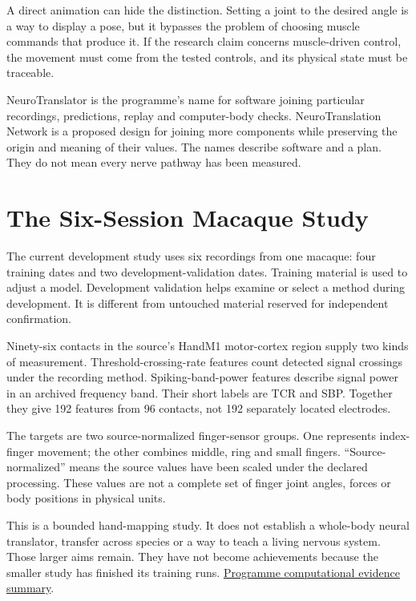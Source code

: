 A direct animation can hide the distinction. Setting a joint to the desired angle is a way to display a pose, but it bypasses the problem of choosing muscle commands that produce it. If the research claim concerns muscle-driven control, the movement must come from the tested controls, and its physical state must be traceable.\par

NeuroTranslator is the programme's name for software joining particular recordings, predictions, replay and computer-body checks. NeuroTranslation Network is a proposed design for joining more components while preserving the origin and meaning of their values. The names describe software and a plan. They do not mean every nerve pathway has been measured.\par

\section{The Six-Session Macaque Study}

The current development study uses six recordings from one macaque: four training dates and two development-validation dates. Training material is used to adjust a model. Development validation helps examine or select a method during development. It is different from untouched material reserved for independent confirmation.\par

Ninety-six contacts in the source's HandM1 motor-cortex region supply two kinds of measurement. Threshold-crossing-rate features count detected signal crossings under the recording method. Spiking-band-power features describe signal power in an archived frequency band. Their short labels are TCR and SBP. Together they give 192 features from 96 contacts, not 192 separately located electrodes.\par

The targets are two source-normalized finger-sensor groups. One represents index-finger movement; the other combines middle, ring and small fingers. ``Source-normalized'' means the source values have been scaled under the declared processing. These values are not a complete set of finger joint angles, forces or body positions in physical units.\par

This is a bounded hand-mapping study. It does not establish a whole-body neural translator, transfer across species or a way to teach a living nervous system. Those larger aims remain. They have not become achievements because the smaller study has finished its training runs. \href{research-evidence.json}{Programme computational evidence summary}.\par


